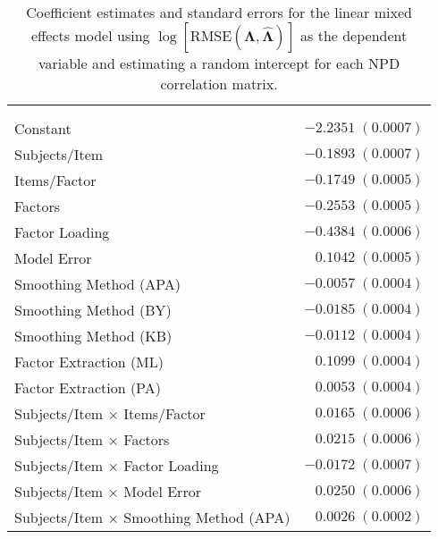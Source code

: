 \documentclass[
  english,
  man]{apa6}
\begin{document}
\begin{center}
\begin{longtable}{l r }
\caption{Coefficient estimates and standard errors for the linear mixed effects model using $\log[\textrm{RMSE}(\mathbf{\Lambda}, \hat{\mathbf{\Lambda}})]$ as the dependent variable and estimating a random intercept for each NPD correlation matrix.}
\label{tab:loading-mod-summary}\\
\hline
 &  \\
\hline
\endfirsthead
\hline
 &  \\
\hline
\endhead
\hline
\endfoot
\hline
\\
\endlastfoot
Constant                                               & $-2.2351 \; (0.0007)$ \\
Subjects/Item                                          & $-0.1893 \; (0.0007)$ \\
Items/Factor                                           & $-0.1749 \; (0.0005)$ \\
Factors                                                & $-0.2553 \; (0.0005)$ \\
Factor Loading                                         & $-0.4384 \; (0.0006)$ \\
Model Error                                            & $0.1042 \; (0.0005)$  \\
Smoothing Method (APA)                                 & $-0.0057 \; (0.0004)$ \\
Smoothing Method (BY)                                  & $-0.0185 \; (0.0004)$ \\
Smoothing Method (KB)                                  & $-0.0112 \; (0.0004)$ \\
Factor Extraction (ML)                                 & $0.1099 \; (0.0004)$  \\
Factor Extraction (PA)                                 & $0.0053 \; (0.0004)$  \\
Subjects/Item $\times$ Items/Factor                    & $0.0165 \; (0.0006)$  \\
Subjects/Item $\times$ Factors                         & $0.0215 \; (0.0006)$  \\
Subjects/Item $\times$ Factor Loading                  & $-0.0172 \; (0.0007)$ \\
Subjects/Item $\times$ Model Error                     & $0.0250 \; (0.0006)$  \\
Subjects/Item $\times$ Smoothing Method (APA)          & $0.0026 \; (0.0002)$  \\

\end{longtable}
\end{center}
\end{document}
